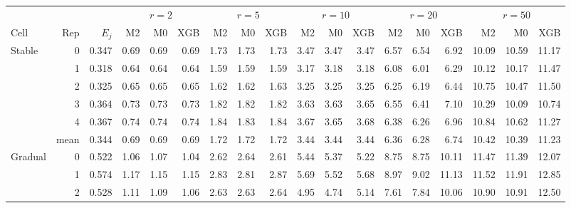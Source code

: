 \clearpage
{}\label{tab:S29.4}
{\scriptsize
\setlength{\tabcolsep}{3pt}
\begin{tabular}{lrr*{5}{rrr}}
\toprule
 & & & \multicolumn{3}{c}{$r=2$} & \multicolumn{3}{c}{$r=5$} & \multicolumn{3}{c}{$r=10$} & \multicolumn{3}{c}{$r=20$} & \multicolumn{3}{c}{$r=50$} \\
\cmidrule(lr){4-6}\cmidrule(lr){7-9}\cmidrule(lr){10-12}\cmidrule(lr){13-15}\cmidrule(lr){16-18}
Cell & Rep & $E_j$ & M2 & M0 & XGB & M2 & M0 & XGB & M2 & M0 & XGB & M2 & M0 & XGB & M2 & M0 & XGB \\
\midrule
Stable & 0 & 0.347 & 0.69 & 0.69 & 0.69 & 1.73 & 1.73 & 1.73 & 3.47 & 3.47 & 3.47 & 6.57 & 6.54 & 6.92 & 10.09 & 10.59 & 11.17 \\
 & 1 & 0.318 & 0.64 & 0.64 & 0.64 & 1.59 & 1.59 & 1.59 & 3.17 & 3.18 & 3.18 & 6.08 & 6.01 & 6.29 & 10.12 & 10.17 & 11.47 \\
 & 2 & 0.325 & 0.65 & 0.65 & 0.65 & 1.62 & 1.62 & 1.63 & 3.25 & 3.25 & 3.25 & 6.25 & 6.19 & 6.44 & 10.75 & 10.47 & 11.50 \\
 & 3 & 0.364 & 0.73 & 0.73 & 0.73 & 1.82 & 1.82 & 1.82 & 3.63 & 3.63 & 3.65 & 6.55 & 6.41 & 7.10 & 10.29 & 10.09 & 10.74 \\
 & 4 & 0.367 & 0.74 & 0.74 & 0.74 & 1.84 & 1.83 & 1.84 & 3.67 & 3.65 & 3.68 & 6.38 & 6.26 & 6.96 & 10.84 & 10.62 & 11.27 \\
 & mean & 0.344 & 0.69 & 0.69 & 0.69 & 1.72 & 1.72 & 1.72 & 3.44 & 3.44 & 3.44 & 6.36 & 6.28 & 6.74 & 10.42 & 10.39 & 11.23 \\
\addlinespace
Gradual & 0 & 0.522 & 1.06 & 1.07 & 1.04 & 2.62 & 2.64 & 2.61 & 5.44 & 5.37 & 5.22 & 8.75 & 8.75 & 10.11 & 11.47 & 11.39 & 12.07 \\
 & 1 & 0.574 & 1.17 & 1.15 & 1.15 & 2.83 & 2.81 & 2.87 & 5.69 & 5.52 & 5.68 & 8.97 & 9.02 & 11.13 & 11.52 & 11.91 & 12.85 \\
 & 2 & 0.528 & 1.11 & 1.09 & 1.06 & 2.63 & 2.63 & 2.64 & 4.95 & 4.74 & 5.14 & 7.61 & 7.84 & 10.06 & 10.90 & 10.91 & 12.50 \\

\end{tabular}}
